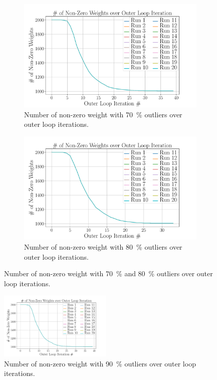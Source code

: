 \begin{figure}[!h]
	\centering
	\begin{subfigure}[b]{0.48\textwidth}
		\centering
		\includegraphics[width=\textwidth]{chapters/2-pose-estimation/fig/GNC-TLS-w-run-70-conv.pdf}
		\caption{Number of non-zero weight with \SI{70}{\percent} outliers over outer loop iterations.}
		\label{app:GNC-TLS-w-run-70-conv}
	\end{subfigure}
	\hfill
	\begin{subfigure}[b]{0.48\textwidth}
		\centering
		\includegraphics[width=\textwidth]{chapters/2-pose-estimation/fig/GNC-TLS-w-run-80-conv.pdf}
		\caption{Number of non-zero weight with \SI{80}{\percent} outliers over outer loop iterations.}
		\label{app:GNC-TLS-w-run-80-conv}
	\end{subfigure}
	\caption{Number of non-zero weight with \SI{70}{\percent} and \SI{80}{\percent} outliers over outer loop iterations.}
	\label{app:GNC-TLS-w-run-70-80-conv}
\end{figure}

\begin{figure}[!h]
	\begin{center}
		\includegraphics[width=0.48\textwidth]{chapters/2-pose-estimation/fig/GNC-TLS-w-run-90-conv.pdf}
	\end{center}
	\caption{Number of non-zero weight with \SI{90}{\percent} outliers over outer loop iterations.}
	\label{app:GNC-TLS-w-run-90-conv}
\end{figure}

